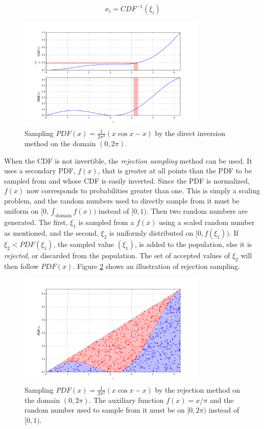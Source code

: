 \begin{equation}
\label{CDF_inversion}
 x_i = CDF^{-1}(\xi_i)
\end{equation}

\begin{figure}[h!] 
  \centering
    \includegraphics[width=0.8\textwidth]{graphics/direct_samp.pdf}
     \caption{Sampling $PDF(x)=\frac{1}{2\pi^2}(x \cos x - x)$ by the direct inversion method on the domain $(0,2\pi)$. \label{direct_samp}}
\end{figure}

When the CDF is not invertible, the \emph{rejection sampling} method can be used.  It uses a secondary PDF, $f(x)$, that is greater at all points than the PDF to be sampled from and whose CDF is easily inverted.  Since the PDF is normalized, $f(x)$ now corresponds to probabilities greater than one.  This is simply a scaling problem, and the random numbers used to directly sample from it must be uniform on $[0,\int_\mathrm{domain}f(x))$ instead of $[0,1)$.   Then two random numbers are generated.  The first, $\xi_1$ is sampled from a $f(x)$ using a scaled random number as mentioned, and the second, $\xi_2$ is uniformly distributed on $[0,f(\xi_1))$.  If $\xi_2 < PDF(\xi_1)$, the sampled value $(\xi_1)$, is added to the population, else it is \emph{rejected}, or discarded from the population.  The set of accepted values of ${\xi_2}$ will then follow $PDF(x)$.  Figure \ref{rejection_samp} shows an illustration of rejection sampling.

\begin{figure}[h!] 
  \centering
    \includegraphics[width=0.8\textwidth]{graphics/rejection_samp.pdf}
     \caption{Sampling $PDF(x)=\frac{1}{2\pi^2}(x \cos x - x)$ by the rejection method on the domain $(0,2\pi)$.  The auxiliary function $f(x)=x/\pi$ and the random number used to sample from it must be on $[0,2\pi)$ instead of $[0,1)$. \label{rejection_samp}}
\end{figure}

